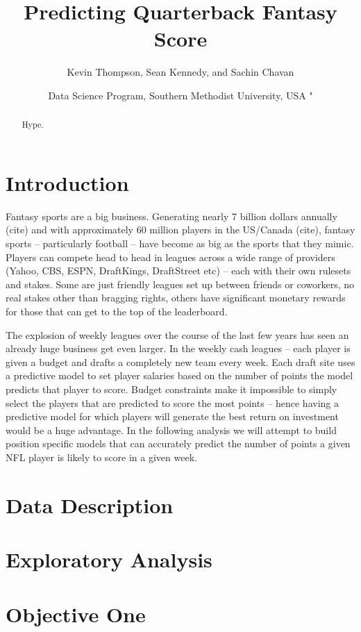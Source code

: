 \documentclass[american,]{article}
\title{Predicting Quarterback Fantasy Score}
\author{Kevin Thompson, Sean Kennedy, and Sachin Chavan}
\date{Data Science Program, Southern Methodist University, USA \break"}
\begin{document}
\maketitle
\begin{abstract}
Hype.
\end{abstract}

\section{Introduction}\label{introduction}

Fantasy sports are a big business. Generating nearly 7 billion dollars
annually (cite) and with approximately 60 million players in the
US/Canada (cite), fantasy sports -- particularly football -- have become
as big as the sports that they mimic. Players can compete head to head
in leagues across a wide range of providers (Yahoo, CBS, ESPN,
DraftKings, DraftStreet etc) -- each with their own rulesets and stakes.
Some are just friendly leagues set up between friends or coworkers, no
real stakes other than bragging rights, others have significant monetary
rewards for those that can get to the top of the leaderboard.

The explosion of weekly leagues over the course of the last few years
has seen an already huge business get even larger. In the weekly cash
leagues -- each player is given a budget and drafts a completely new
team every week. Each draft site uses a predictive model to set player
salaries based on the number of points the model predicts that player to
score. Budget constraints make it impossible to simply select the
players that are predicted to score the most points -- hence having a
predictive model for which players will generate the best return on
investment would be a huge advantage. In the following analysis we will
attempt to build position specific models that can accurately predict
the number of points a given NFL player is likely to score in a given
week.

\section{Data Description}\label{data-description}

\section{Exploratory Analysis}\label{exploratory-analysis}

\section{Objective One}\label{objective-one}
\end{document}
